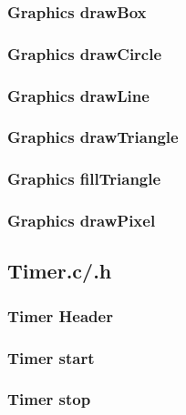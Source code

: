 \documentclass[a4paper,12pt]{article}
\newcommand{\GraphicsC}{../Graphics/Graphics.c}
\newcommand{\TimerC}{../Timer/Timer.c}
\newcommand{\TimerH}{../Timer/Timer.h}
\begin{document}
\subsubsection{Graphics drawBox}

\subsubsection{Graphics drawCircle}

\subsubsection{Graphics drawLine}
\newpage

\newpage
\subsubsection{Graphics drawTriangle}

\newpage
\subsubsection{Graphics fillTriangle}

\subsubsection{Graphics drawPixel}


\newpage
\subsection{Timer.c/.h}
\subsubsection{Timer Header}

\subsubsection{Timer start}

\subsubsection{Timer stop}

\end{document}
